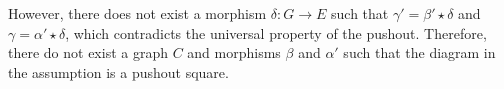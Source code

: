 \begin{center}
{
        }
    \end{center} 
    However, there does not exist a morphism \(\delta : G \to E\) such that \( \gamma' = \beta' \star \delta \) and \( \gamma = \alpha' \star \delta \), which contradicts the universal property of the pushout. Therefore, there do not exist a graph \( C \) and morphisms \( \beta \) and \( \alpha' \) such that the diagram in the assumption is a pushout square.


